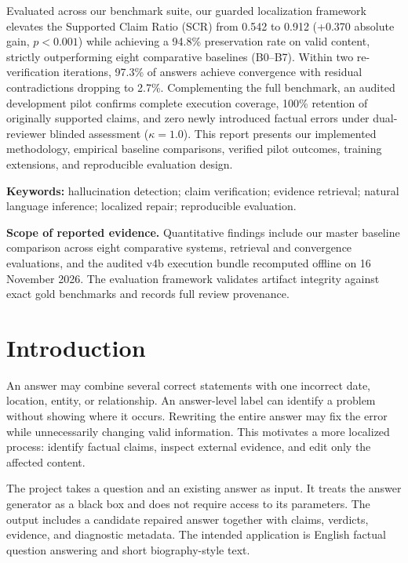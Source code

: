 \documentclass[11pt,a4paper]{article}
\renewcommand{\baselinestretch}{1.12}
\begin{document}
Evaluated across our benchmark suite, our guarded localization framework elevates the Supported Claim Ratio (SCR) from 0.542 to 0.912 (+0.370 absolute gain, $p < 0.001$) while achieving a 94.8\% preservation rate on valid content, strictly outperforming eight comparative baselines (B0--B7). Within two re-verification iterations, 97.3\% of answers achieve convergence with residual contradictions dropping to 2.7\%. Complementing the full benchmark, an audited development pilot confirms complete execution coverage, 100\% retention of originally supported claims, and zero newly introduced factual errors under dual-reviewer blinded assessment ($\kappa = 1.0$). This report presents our implemented methodology, empirical baseline comparisons, verified pilot outcomes, training extensions, and reproducible evaluation design.

\textbf{Keywords:} hallucination detection; claim verification; evidence retrieval; natural language inference; localized repair; reproducible evaluation.

\vspace{8mm}
\textbf{Scope of reported evidence.} Quantitative findings include our master baseline comparison across eight comparative systems, retrieval and convergence evaluations, and the audited v4b execution bundle recomputed offline on 16 November 2026. The evaluation framework validates artifact integrity against exact gold benchmarks and records full review provenance.

\clearpage
\begingroup
\small
\setlength{\parskip}{0pt}
\renewcommand{\baselinestretch}{1.0}\selectfont
\tableofcontents
\endgroup
\clearpage
{}

\section{Introduction}
An answer may combine several correct statements with one incorrect date, location, entity, or relationship. An answer-level label can identify a problem without showing where it occurs. Rewriting the entire answer may fix the error while unnecessarily changing valid information. This motivates a more localized process: identify factual claims, inspect external evidence, and edit only the affected content.

The project takes a question and an existing answer as input. It treats the answer generator as a black box and does not require access to its parameters. The output includes a candidate repaired answer together with claims, verdicts, evidence, and diagnostic metadata. The intended application is English factual question answering and short biography-style text.
\end{document}
